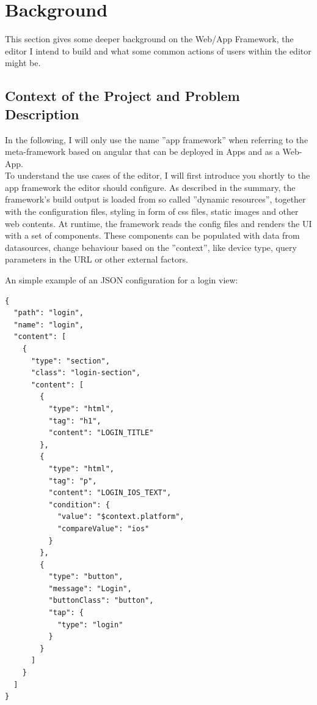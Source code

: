 \section{Background}
\label{sec:background}
This section gives some deeper background on the Web/App Framework, the editor I intend to build and what some common actions of users within the editor might be.
\subsection{Context of the Project and Problem Description} 
\label{sec:context}
In the following, I will only use the name ''app framework'' when referring to the meta-framework based on angular that can be deployed in Apps and as a Web-App.\\

To understand the use cases of the editor, I will first introduce you shortly to the app framework the editor should configure.
As described in the summary, the framework's build output is loaded from so called ''dynamic resources'', together with the configuration files, styling in form of css files, static images and other web contents.
At runtime, the framework reads the config files and renders the UI with a set of components. These components can be populated with data from datasources, change behaviour based on the ''context'', like device type,
query parameters in the URL or other external factors.

An simple example of an JSON configuration for a login view:

\begin{verbatim}
{
  "path": "login",
  "name": "login",
  "content": [
    {
      "type": "section",
      "class": "login-section",
      "content": [
        {
          "type": "html",
          "tag": "h1",
          "content": "LOGIN_TITLE"
        },
        {
          "type": "html",
          "tag": "p",
          "content": "LOGIN_IOS_TEXT",
          "condition": {
            "value": "$context.platform",
            "compareValue": "ios"
          }
        },
        {
          "type": "button",
          "message": "Login",
          "buttonClass": "button",
          "tap": {
            "type": "login"
          }
        }
      ]
    }
  ]
}
\end{verbatim}

